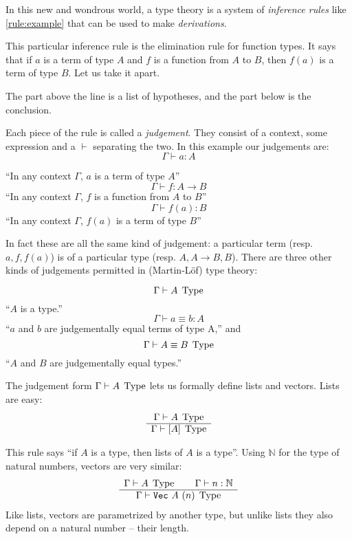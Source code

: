 In this new and wondrous world, a type theory is a system of \emph{inference
  rules} like \ref{rule:example} that can be used to make \emph{derivations}.

This particular inference rule is the elimination rule for function types. It
says that if $a$ is a term of type $A$ and $f$ is a function from $A$ to $B$,
then $f(a)$ is a term of type $B$. Let us take it apart.

The part above the line is a list of hypotheses, and the part below is the conclusion.

Each piece of the rule is called a \emph{judgement}. They consist of a
context, some expression and a $\vdash$ separating the two. In this example our judgements are:
\[\Gamma \vdash a : A\]
\begin{center}
``In any context $\Gamma$, $a$ is a term of type $A$''
\[\Gamma \vdash f : A \rightarrow B\]
``In any context $\Gamma$, $f$ is a function from $A$ to $B$''
\[\Gamma \vdash f(a) : B\]
``In any context $\Gamma$, $f(a)$ is a term of type $B$''
\end{center}

In fact these are all the same kind of judgement: a particular term (resp. $a, f,
f(a)$) is of a particular type (resp. $A, A \rightarrow B, B$). There are three
other kinds of judgements permitted in (Martin-Löf) type theory:
\begin{center}
  \[\Gamma \vdash A \; \operatorname{Type}\]
  ``$A$ is a type.''
  \[\Gamma \vdash a \equiv b : A\]
  ``$a$ and $b$ are judgementally equal terms of type A,'' and
  \[\Gamma \vdash A \equiv B \; \operatorname{Type}\]
  ``$A$ and $B$ are judgementally equal types.''
\end{center}

The judgement form $\Gamma \vdash A \; \operatorname{Type}$ lets us formally define lists and
vectors. Lists are easy:
\begin{equation*}
  \begin{array}{c}
    \Gamma \vdash A \; \operatorname{Type} \\
    \hline
    \Gamma \vdash [A] \; \operatorname{Type}
  \end{array}
  \label{rule:lists}
\end{equation*}

This rule says ``if $A$ is a type, then lists of $A$ is a type''. Using
$\mathbb{N}$ for the type of natural numbers, vectors are very similar:
\begin{equation*}
  \begin{array}{c}
    \Gamma \vdash A \; \operatorname{Type} \qquad \Gamma \vdash n : \mathbb{N} \\
    \hline
    \Gamma \vdash \texttt{Vec}~A~(n) \; \operatorname{Type}
  \end{array}
  \label{rule:vectors}
\end{equation*}
Like lists, vectors are parametrized by another type, but unlike lists they also
depend on a natural number -- their length.

